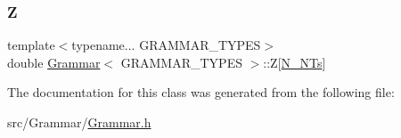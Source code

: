 \subsubsection{\texorpdfstring{Z}{Z}}
{\footnotesize\ttfamily template$<$typename... G\+R\+A\+M\+M\+A\+R\+\_\+\+T\+Y\+P\+ES$>$ \\
double \hyperlink{class_grammar}{Grammar}$<$ G\+R\+A\+M\+M\+A\+R\+\_\+\+T\+Y\+P\+ES $>$\+::Z\mbox{[}\hyperlink{class_grammar_a45877d4d7a5ee98bf6753af593d6ca08}{N\+\_\+\+N\+Ts}\mbox{]}}



The documentation for this class was generated from the following file\+:\begin{DoxyCompactItemize}
\item 
src/\+Grammar/\hyperlink{_grammar_8h}{Grammar.\+h}\end{DoxyCompactItemize}
